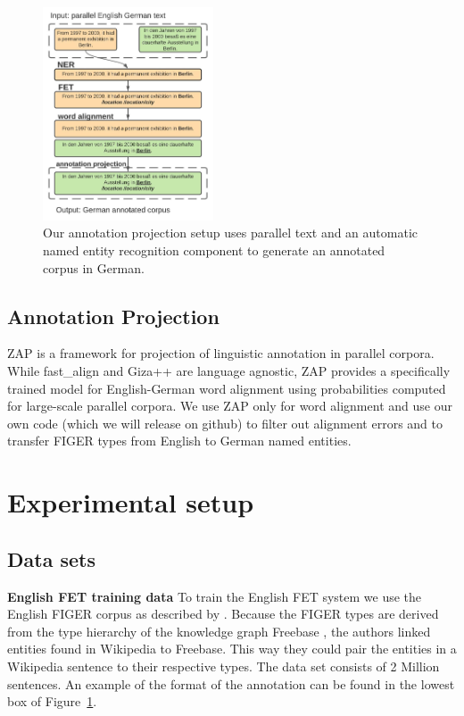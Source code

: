 \documentclass[11pt,a4paper]{article}
\begin{document}
\begin{figure}[t]

\centering
\includegraphics[width=0.45\textwidth]{annotation1.jpeg}
\caption{Our annotation projection setup uses parallel text and an automatic named entity recognition component to generate an annotated corpus in German.}
\label{figure:cut}
\end{figure}

\subsection{Annotation Projection}
ZAP \cite{zap:2020} is a framework for projection of linguistic annotation in parallel corpora. While fast\_align and Giza++ are language agnostic, ZAP provides a specifically trained model for English-German word alignment using probabilities computed for large-scale parallel corpora. We use ZAP only for word alignment and use our own code (which we will release on github) to filter out alignment errors and to transfer FIGER types from English to German named entities. 



\section{Experimental setup}
\subsection{Data sets}
\textbf{English FET training data} To train the English FET system we use the English FIGER corpus as described by \cite{ling2012fine}. Because the FIGER types are derived from the type hierarchy of the knowledge graph Freebase \citep{10.1145/1376616.1376746}, the authors linked entities found in Wikipedia to Freebase. This way they could pair the entities in a Wikipedia sentence to their respective types. The data set consists of 2 Million sentences. An example of the format of the annotation can be found in the lowest box of Figure~\ref{figure:cut}.
\end{document}
